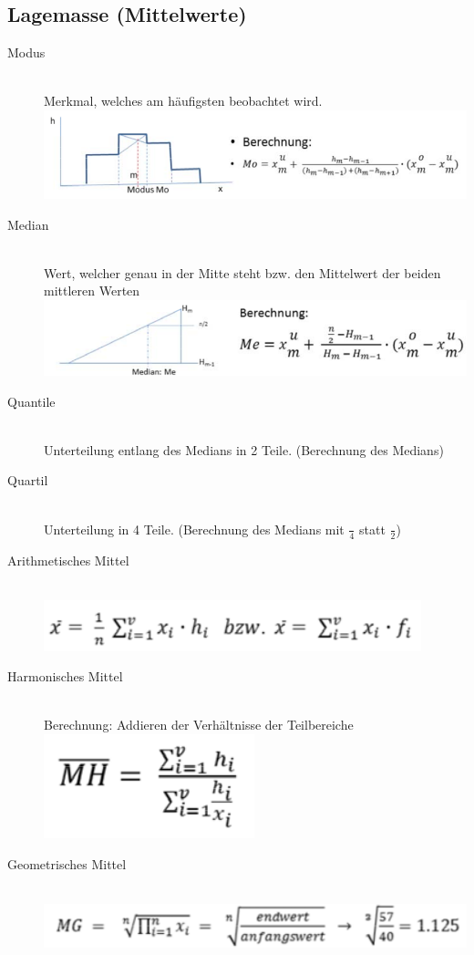 \subsection{Lagemasse (Mittelwerte)}
\begin{description}
	\item[Modus] \hfill \\
		Merkmal, welches am häufigsten beobachtet wird.  \\
		\includegraphics[scale=0.3]{img/modus.png}
	\item[Median] \hfill \\
		Wert, welcher genau in der Mitte steht bzw. den Mittelwert der beiden mittleren Werten \\
		\includegraphics[scale=0.3]{img/median.png}
	\item[Quantile] \hfill \\
		Unterteilung entlang des Medians in 2 Teile. (Berechnung des Medians)
	\item[Quartil] \hfill \\
		Unterteilung in 4 Teile. (Berechnung des Medians mit $\frac{}{4}$ statt $\frac{}{2}$)
	\item[Arithmetisches Mittel] \hfill \\
		\includegraphics[scale=0.3]{img/arithmetisches_mittel.png}
	\item[Harmonisches Mittel] \hfill \\
		Berechnung: Addieren der Verhältnisse der Teilbereiche \\
		\includegraphics[scale=0.3]{img/harmonisches_mittel.png}
	\item[Geometrisches Mittel] \hfill \\
		\includegraphics[scale=0.3]{img/geometrisches_mittel.png}
		
\end{description}

